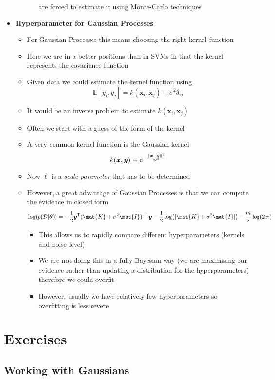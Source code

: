 \documentclass[11pt]{article}
\newcommand{\tr}{\textsf{T}}
\newcommand{\av}[2][]{\mathbb{E}_{#1\!}\left[ #2 \right]}
\newcommand{\logg}[1]{\log\!\left( #1 \right)}
\newcommand{\e}[1]{{\rm e}^{#1}}
\begin{document}
\begin{itemize}
\begin{itemize}
\begin{itemize}
are forced to estimate it using Monte-Carlo techniques
\end{itemize}
\end{itemize}
\item \textbf{Hyperparameter for Gaussian Processes}
\begin{itemize}
\item For Gaussian Processes this means choosing the right kernel function
\item Here we are in a better positions than in SVMs in that the kernel
represents the covariance function
\item Given data we could estimate the kernel function using
$$ \av{y_i,y_j} = k(\bm{x}_i,\bm{x}_j) + \sigma^2 \delta_{ij} $$
\item It would be an inverse problem to estimate \(k(\bm{x}_i,\bm{x}_j)\)
\item Often we start with a guess of the form of the kernel
\item A very common kernel function is the Gaussian kernel
$$ k(\bm{x},\bm{y}) = \e{-\frac{\|\bm{x}-\bm{y}\|^2}{2\ell^2}} $$
\item Now \(\ell\) is a \emph{scale parameter} that has to be determined
\item However, a great advantage of Gaussian Processes is that we can
compute the evidence in closed form
$$  \logg{p(\mathcal{D}|\bm{\theta})} = - \frac{1}{2} \bm{y}^\tr (\mat{K}+\sigma^2\mat{I})^{-1} \bm{y} - \frac{1}{2}  \logg{|\mat{K}+\sigma^2\mat{I}|} - \frac{m}{2} \log(2\,\pi) $$
\begin{itemize}
\item This allows us to rapidly compare different hyperparameters
(kernels and noise level)
\item We are not doing this in a fully Bayesian way (we are
maximising our evidence rather than updating a distribution
for the hyperparameters) therefore we could overfit
\item However, usually we have relatively few hyperparameters so
overfitting is less severe
\end{itemize}
\end{itemize}
\end{itemize}

\section{Exercises}
\label{sec:org07031ce}

\subsection{Working with Gaussians}
\label{sec:org393fd1c}
\end{document}
